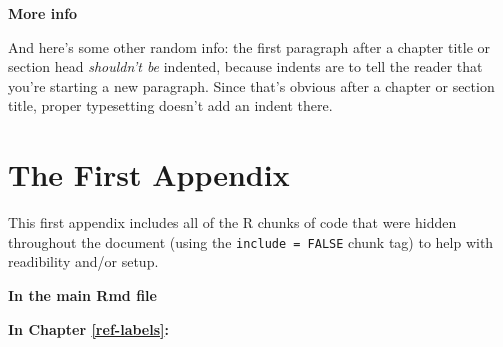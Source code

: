 \documentclass[12pt,twoside]{reedthesis}
\begin{document}
  \textbf{More info}
  
  And here's some other random info: the first paragraph after a chapter
  title or section head \emph{shouldn't be} indented, because indents are
  to tell the reader that you're starting a new paragraph. Since that's
  obvious after a chapter or section title, proper typesetting doesn't add
  an indent there.
  
  \appendix
  
  \chapter{The First Appendix}\label{the-first-appendix}
  
  This first appendix includes all of the R chunks of code that were
  hidden throughout the document (using the \texttt{include\ =\ FALSE}
  chunk tag) to help with readibility and/or setup.
  
  \textbf{In the main Rmd file}
  
  \begin{Shaded}
  \begin{Highlighting}[]
    \NormalTok{(}\NormalTok{, } \NormalTok{)}
    \NormalTok{(}\NormalTok{)}
  \end{Highlighting}
  \end{Shaded}
  
  \textbf{In Chapter \ref{ref-labels}:}
  
\end{document}
